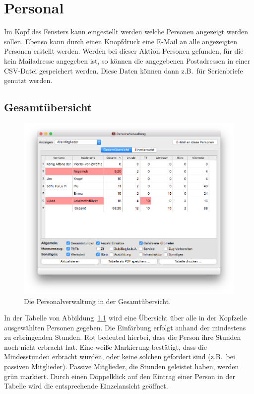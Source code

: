 \chapter{Personal}\label{personal}
Im Kopf des Fensters kann eingestellt werden welche Personen angezeigt werden sollen.
Ebenso kann durch einen Knopfdruck eine E-Mail an alle angezeigten Personen erstellt werden.
Werden bei dieser Aktion Personen gefunden, für die kein Mailadresse angegeben ist,
so können die angegebenen Postadressen in einer CSV-Datei gespeichert werden.
Diese Daten können dann z.B.\ für Serienbriefe genutzt werden.

\section{Gesamtübersicht}\label{personal:gesamtansicht}
\begin{figure}[!h]
	\includegraphics[width=\textwidth]{img/personal_gesamt}
	\caption{Die Personalverwaltung in der Gesamtübersicht.}
	\label{fig:personal:gesamt}
\end{figure}
In der Tabelle von Abbildung~\ref{fig:personal:gesamt} wird eine Übersicht über alle in der Kopfzeile ausgewählten Personen gegeben.
Die Einfärbung erfolgt anhand der mindestens zu erbringenden Stunden.
Rot bedeuted hierbei, dass die Person ihre Stunden noch nicht erbracht hat.
Eine weiße Markierung bestätigt, dass die Mindesstunden erbracht wurden, oder keine solchen gefordert sind (z.B.\ bei passiven Mitglieder).
Passive Mitglieder, die Stunden geleistet haben, werden grün markiert.
Durch einen Doppelklick auf den Eintrag einer Person in der Tabelle wird die entsprechende Einzelansicht geöffnet.


